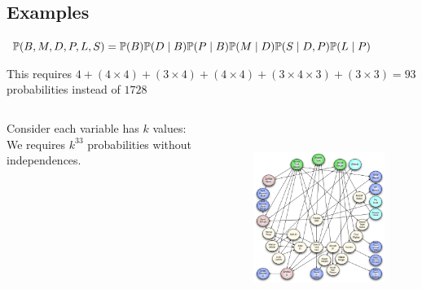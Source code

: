 \subsection{Examples}

\begin{frame}[fragile]
	\begin{figure}
		\centering
		
	\end{figure}
	\begin{block}{}
		$\P( B , M , D , P , L , S ) = \P( B ) \P( D \mid B ) \P( P \mid B ) \P( M \mid D ) \P( S \mid D , P ) \P( L \mid P )$
	\end{block}
	This requires $4 + (4 \times 4) + (3 \times 4) + (4 \times 4) + (3 \times 4 \times 3) + (3 \times 3) = 93$ probabilities instead of $1728$
\end{frame}
	
\begin{frame}[fragile]
	\begin{columns}
		\begin{column}{.3\linewidth}
			Consider each variable has $k$ values:\\
			We requires $k^{33}$ probabilities without independences.
		\end{column}
		\begin{column}{.6\linewidth}
			\begin{figure}
				\centering
				\includegraphics[height=17em]{images/complexbn}
			\end{figure}
		\end{column}
	\end{columns}
\end{frame}